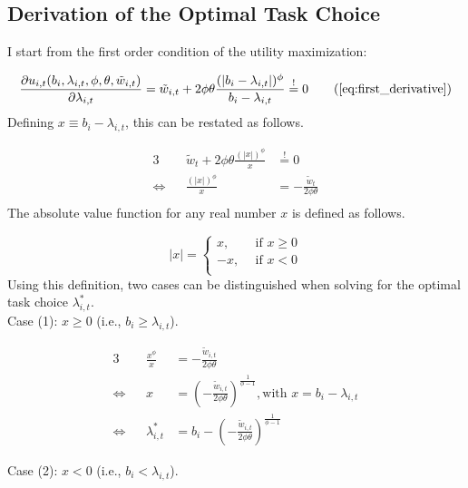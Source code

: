 \documentclass[../main.tex]{subfiles}
\begin{document}
\subsection{Derivation of the Optimal Task Choice} \label{app:derive_lmb_opt}
I start from the first order condition of the utility maximization:

\begin{equation}
	\frac{\partial u_{i, t}(b_i, \lambda_{i,t}, \phi, \theta, \tilde{w}_{i,t})}{\partial \lambda_{i,t}} = \tilde{w}_{i,t} + 2 \phi \theta \frac{(|b_i - \lambda_{i,t}|)^\phi}{b_i - \lambda_{i,t}} \overset{!}{=} 0 \tag{\ref{eq:first_derivative}}
\end{equation}
Defining $x \equiv b_i - \lambda_{i,t}$, this can be restated as follows.

\begin{alignat*}{3}
	{}					&& \tilde{w}_t + 2 \phi \theta \frac{(|x|)^\phi}{x} 	&\overset{!}{=} 0 \\
	\Leftrightarrow 	&& \frac{(|x|)^\phi}{x} 								&= - \frac{\tilde{w}_t}{2 \phi \theta} \label{eq:foc_restated} \\
\end{alignat*}
The absolute value function for any real number $x$ is defined as follows.

\begin{equation}
	|x| = \left\{
		\begin{array}{ll}
			x, \: & \: \text{if $x \geq 0$} \nonumber\\
			-x, \: & \: \text{if $x < 0$} \nonumber\\
		\end{array}
	\right.
\end{equation}
Using this definition, two cases can be distinguished when solving for the optimal task choice $\lambda^*_{i,t}$. \\

Case (1): $x \geq 0$ (i.e., $b_i \geq \lambda_{i,t}$).

\begin{alignat*}{3}
	{}				&& \frac{x^\phi}{x} 	&= - \frac{\tilde{w}_{i,t}}{2 \phi \theta} \\
	\Leftrightarrow && x					&= (- \frac{\tilde{w}_{i,t}}{2 \phi \theta})^{\frac{1}{\phi-1}}, \text{with $x = b_i - \lambda_{i,t}$} \\
	\Leftrightarrow && \lambda^*_{i,t} 		&= b_i - (- \frac{\tilde{w}_{i,t}}{2 \phi \theta})^{\frac{1}{\phi-1}}
\end{alignat*}

Case (2): $x < 0 $ (i.e., $b_i < \lambda_{i,t}$).
\end{document}

